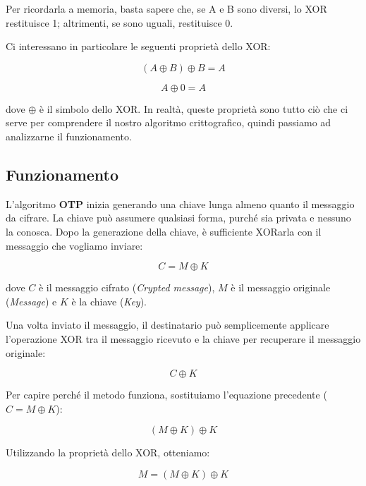 \documentclass{rapport}
\begin{document}
Per ricordarla a memoria, basta sapere che, se A e B sono diversi, lo XOR restituisce 1; altrimenti, se sono uguali, restituisce 0.

Ci interessano in particolare le seguenti proprietà dello XOR:

\begin{equation*} (A \oplus B) \oplus B = A \end{equation*}

\begin{equation*} A \oplus 0 = A \end{equation*}

dove $\oplus$ è il simbolo dello XOR. In realtà, queste proprietà sono tutto ciò che ci serve per comprendere il nostro algoritmo crittografico, quindi passiamo ad analizzarne il funzionamento.

\newpage
\subsection{Funzionamento}
L'algoritmo \textbf{OTP} inizia generando una chiave lunga almeno quanto il messaggio da cifrare. La chiave può assumere qualsiasi forma, purché sia privata e nessuno la conosca. Dopo la generazione della chiave, è sufficiente XORarla con il messaggio che vogliamo inviare:  

\begin{equation*}
    C = M \oplus K 
\end{equation*}

dove \(C\) è il messaggio cifrato (\textit{Crypted message}), \(M\) è il messaggio originale (\textit{Message}) e \(K\) è la chiave (\textit{Key}).  

Una volta inviato il messaggio, il destinatario può semplicemente applicare l'operazione XOR tra il messaggio ricevuto e la chiave per recuperare il messaggio originale:  

\begin{equation*}
   C \oplus K
\end{equation*}

Per capire perché il metodo funziona, sostituiamo l'equazione precedente (\(C = M \oplus K\)):  

\begin{equation*}
    (M \oplus K) \oplus K
\end{equation*}

Utilizzando la proprietà dello XOR, otteniamo:  

\begin{equation*}
    M = (M \oplus K) \oplus K 
\end{equation*}
\end{document}
